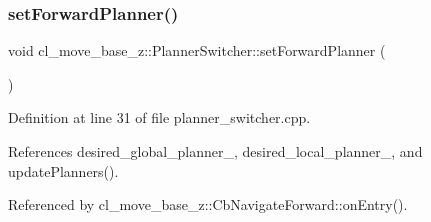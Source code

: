 \subsubsection{\texorpdfstring{set\+Forward\+Planner()}{setForwardPlanner()}}
{\footnotesize\ttfamily void cl\+\_\+move\+\_\+base\+\_\+z\+::\+Planner\+Switcher\+::set\+Forward\+Planner (\begin{DoxyParamCaption}{ }\end{DoxyParamCaption})}



Definition at line 31 of file planner\+\_\+switcher.\+cpp.



References desired\+\_\+global\+\_\+planner\+\_\+, desired\+\_\+local\+\_\+planner\+\_\+, and update\+Planners().



Referenced by cl\+\_\+move\+\_\+base\+\_\+z\+::\+Cb\+Navigate\+Forward\+::on\+Entry().


